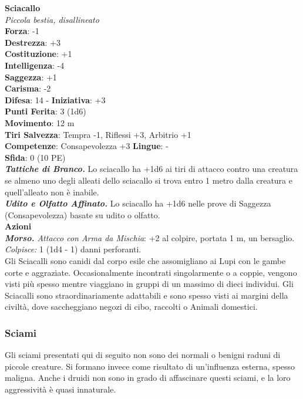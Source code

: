 \begin{multicols}{2}
\medskip\textbf{Sciacallo}\\
\emph{Piccola bestia, disallineato}\\
\textbf{Forza}: -1\\
\textbf{Destrezza}: +3\\
\textbf{Costituzione}: +1\\
\textbf{Intelligenza}: -4\\
\textbf{Saggezza}: +1\\
\textbf{Carisma}: -2\\
\textbf{Difesa}: 14 - \textbf{Iniziativa}: +3\\
\textbf{Punti Ferita}: 3 (1d6)\\
\textbf{Movimento}: 12 m\\
\textbf{Tiri Salvezza}: Tempra -1, Riflessi +3, Arbitrio +1\\
\textbf{Competenze}: Consapevolezza +3
\textbf{Lingue}: -\\
\textbf{Sfida}: 0 (10 PE)\smallskip\\
\emph{\textbf{Tattiche di Branco.}} Lo sciacallo ha +1d6 ai tiri di attacco contro una creatura se almeno uno degli alleati dello sciacallo si trova entro 1 metro dalla creatura e quell'alleato non è inabile.\\
\emph{\textbf{Udito e Olfatto Affinato.}} Lo sciacallo ha +1d6 nelle prove di Saggezza (Consapevolezza) basate su udito o olfatto.\\
\smallskip\textbf{Azioni}\\
\emph{\textbf{Morso.} Attacco con Arma da Mischia}: +2 al colpire, portata 1 m, un bersaglio.\\
\emph{Colpisce:} 1 (1d4 - 1) danni perforanti.\\
Gli Sciacalli sono canidi dal corpo esile che assomigliano ai Lupi con le gambe corte e aggraziate. Occasionalmente incontrati singolarmente o a coppie, vengono visti più spesso mentre viaggiano in gruppi di un massimo di dieci individui. Gli Sciacalli sono straordinariamente adattabili e sono spesso visti ai margini della civiltà, dove saccheggiano negozi di cibo, raccolti o Animali domestici.\\

\subsubsection{Sciami}

Gli sciami presentati qui di seguito non sono dei normali o benigni raduni di piccole creature. Si formano invece come risultato di un'influenza esterna, spesso maligna. Anche i druidi non sono in grado di affascinare questi sciami, e la loro aggressività è quasi innaturale.\\


\end{multicols}
